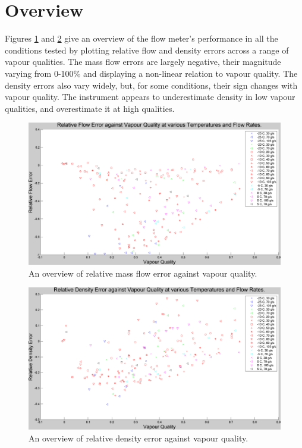 \documentclass{report}
\begin{document}
\section{Overview}
\FloatBarrier
Figures \ref{plot:1} and \ref{plot:2} give an overview of the flow meter's performance in all the conditions tested by plotting relative flow and density errors across a range of vapour qualities. The mass flow errors are largely negative, their magnitude varying from 0-100\% and displaying a non-linear relation to vapour quality. The density errors also vary widely, but, for some conditions, their sign changes with vapour quality. The instrument appears to underestimate density in low vapour qualities, and overestimate it at high qualities.\\
\FloatBarrier
\begin{figure}
\includegraphics[width=\textwidth]{plots/fig1}
\caption{An overview of relative mass flow error against vapour quality.}
\label{plot:1}
\end{figure}
\begin{figure}
\includegraphics[width=\textwidth]{plots/fig2}
\caption{An overview of relative density error against vapour quality.}
\label{plot:2}
\end{figure}
\end{document}
